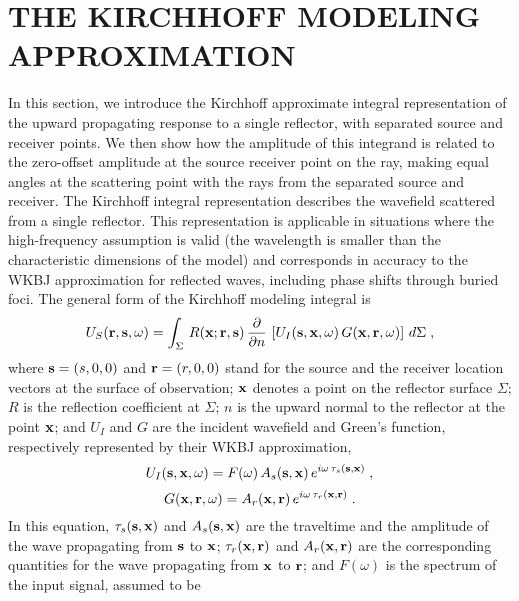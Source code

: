 \section{THE KIRCHHOFF MODELING APPROXIMATION}
In this section, we introduce the Kirchhoff approximate integral
representation of the upward propagating response to a single
reflector, with separated source and receiver points.  We then show
how the amplitude of this integrand is related to the zero-offset
amplitude at the source receiver point on the ray, making equal angles
at the scattering point with the rays from the separated source and
receiver.  The Kirchhoff integral representation \cite[]{haddon,norm}
describes the wavefield scattered from a single reflector. This
representation is applicable in situations where the high-frequency
assumption is valid (the wavelength is smaller than the characteristic
dimensions of the model) and corresponds in accuracy to the WKBJ
approximation for reflected waves, including phase shifts through
buried foci.  The general form of the Kirchhoff modeling integral is
\begin{equation}
U_S({\bf r,s, \omega}) = \int_\Sigma\,R ({\bf x;r,s})\,
{\partial \over {\partial n}}\,\left[ 
U_I({\bf s, x ,\omega})\,G({\bf x,r,\omega})\right]\,
d\Sigma \; ,
\label{eqn:KI}
\end{equation}  
where ${\bf s} = (s,0,0)$ and ${\bf r} = (r,0,0)$ stand for the source
and the receiver location vectors at the surface of observation; ${\bf
x}$ denotes a point on the reflector surface $\Sigma$; $R $ is the
reflection coefficient at $\Sigma$; $n$ is the upward normal to the
reflector at the point ${\bf x}$; and $U_I$ and $G$ are the incident
wavefield and Green's function, respectively represented by their WKBJ
approximation,
\begin{equation}
U_I({\bf s,x,\omega}) = F(\omega)\,
A_s({\bf s,x})\,e^{i\omega\,\tau_s({\bf s,x})}\;,
\label{eqn:ui}
\end{equation}  
\begin{equation}
G({\bf x,r,\omega}) = A_r({\bf x,r})\,e^{i\omega\,\tau_r({\bf x,r})}\;.
\label{eqn:g}
\end{equation}
In this equation,
$\tau_s({\bf s,x})$ and $A_s({\bf s,x})$ are the traveltime and the
amplitude of the wave propagating from ${\bf s}$ to ${\bf x}$;
$\tau_r({\bf x,r})$ and $A_r({\bf x,r})$ are the corresponding
quantities for the wave propagating from ${\bf x}$ to ${\bf r}$; and
$F(\omega)$ is the spectrum of the input signal, assumed to be
